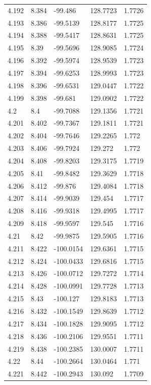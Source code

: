 \begin{tabular}{lllll}
4.192 & 8.384 & -99.486 & 128.7723 & 1.7726 \\
4.193 & 8.386 & -99.5139 & 128.8177 & 1.7725 \\
4.194 & 8.388 & -99.5417 & 128.8631 & 1.7725 \\
4.195 & 8.39 & -99.5696 & 128.9085 & 1.7724 \\
4.196 & 8.392 & -99.5974 & 128.9539 & 1.7723 \\
4.197 & 8.394 & -99.6253 & 128.9993 & 1.7723 \\
4.198 & 8.396 & -99.6531 & 129.0447 & 1.7722 \\
4.199 & 8.398 & -99.681 & 129.0902 & 1.7722 \\
4.2 & 8.4 & -99.7088 & 129.1356 & 1.7721 \\
4.201 & 8.402 & -99.7367 & 129.1811 & 1.7721 \\
4.202 & 8.404 & -99.7646 & 129.2265 & 1.772 \\
4.203 & 8.406 & -99.7924 & 129.272 & 1.772 \\
4.204 & 8.408 & -99.8203 & 129.3175 & 1.7719 \\
4.205 & 8.41 & -99.8482 & 129.3629 & 1.7718 \\
4.206 & 8.412 & -99.876 & 129.4084 & 1.7718 \\
4.207 & 8.414 & -99.9039 & 129.454 & 1.7717 \\
4.208 & 8.416 & -99.9318 & 129.4995 & 1.7717 \\
4.209 & 8.418 & -99.9597 & 129.545 & 1.7716 \\
4.21 & 8.42 & -99.9875 & 129.5905 & 1.7716 \\
4.211 & 8.422 & -100.0154 & 129.6361 & 1.7715 \\
4.212 & 8.424 & -100.0433 & 129.6816 & 1.7715 \\
4.213 & 8.426 & -100.0712 & 129.7272 & 1.7714 \\
4.214 & 8.428 & -100.0991 & 129.7728 & 1.7713 \\
4.215 & 8.43 & -100.127 & 129.8183 & 1.7713 \\
4.216 & 8.432 & -100.1549 & 129.8639 & 1.7712 \\
4.217 & 8.434 & -100.1828 & 129.9095 & 1.7712 \\
4.218 & 8.436 & -100.2106 & 129.9551 & 1.7711 \\
4.219 & 8.438 & -100.2385 & 130.0007 & 1.7711 \\
4.22 & 8.44 & -100.2664 & 130.0464 & 1.771 \\
4.221 & 8.442 & -100.2943 & 130.092 & 1.7709 \\

\end{tabular}
